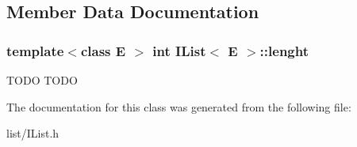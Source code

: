 \subsection{Member Data Documentation}
\hypertarget{classIList_a64ce981ba1104bbb482068983cb5a3bc}{
\subsubsection[{lenght}]{\setlength{\rightskip}{0pt plus 5cm}template$<$class E $>$ int {\bf I\-List}$<$ E $>$\-::lenght\hspace{0.3cm}{\ttfamily [protected]}}}\label{classIList_a64ce981ba1104bbb482068983cb5a3bc}
T\-O\-D\-O T\-O\-D\-O 

The documentation for this class was generated from the following file\-:\begin{DoxyCompactItemize}
\item 
list/I\-List.\-h\end{DoxyCompactItemize}
